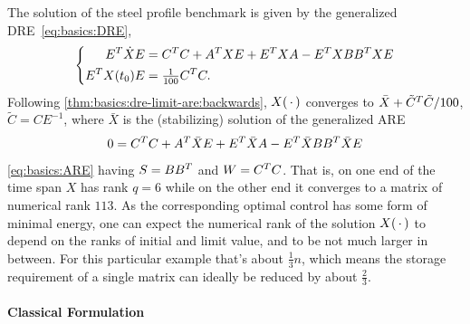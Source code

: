 \begin{example}
\label{thm:lowrank:rail}
  The solution of the steel profile benchmark \cite{morwiki_steel} is given by the generalized \ac{DRE}~\eqref{eq:basics:DRE},
  \begin{equation*}
  \left\{
  \begin{aligned}
    E^T \dot X E &= C^T C + A^T X E + E^T X A - E^T X BB^T X E \\
    E^T X(t_0) E &= \tfrac{1}{100} C^T C
    .
  \end{aligned}
  \right.
  \end{equation*}
  Following \autoref{thm:basics:dre-limit-are:backwards},
  $X(\optional{})$ converges to $\bar X + \tilde C^T \tilde C / 100$,
  $\tilde C = C E^{-1}$,
  where $\bar X$ is the (stabilizing) solution of the generalized \ac{ARE}
  \begin{equation*}
    0 = C^T C + A^T \bar X E + E^T \bar X A - E^T \bar X BB^T \bar X E
  \end{equation*}
  \cf \eqref{eq:basics:ARE} having $S = BB^T$ and $W = C^T C$.
  That is, on one end of the time span $X$ has rank $q=6$
  while on the other end it converges to a matrix of numerical rank $113$.
  As the corresponding optimal control has some form of minimal energy,
  one can expect the numerical rank of the solution $X(\optional{})$ to depend on the ranks of initial and limit value,
  and to be not much larger in between.
  For this particular example that's about $\frac{1}{3}n$,
  which means the storage requirement of a single matrix can ideally be reduced by about $\frac{2}{3}$.
\end{example}

\paragraph{Classical Formulation}

